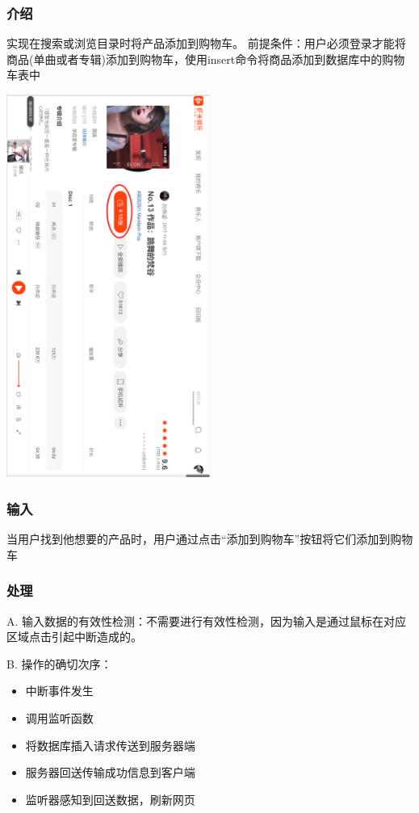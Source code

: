    \subsubsection{介绍}
   实现在搜索或浏览目录时将产品添加到购物车。
   前提条件：用户必须登录才能将商品(单曲或者专辑)添加到购物车，使用insert命令将商品添加到数据库中的购物车表中
   \begin{center}
	\begin{sideways} 
   \includegraphics[width=0.5\textwidth]{./figures/capture12.png} 
	\end{sideways}
\end{center}
   \subsubsection{输入}
   
   当用户找到他想要的产品时，用户通过点击“添加到购物车”按钮将它们添加到购物车


   \subsubsection{处理}
   

   
   A. 输入数据的有效性检测：不需要进行有效性检测，因为输入是通过鼠标在对应区域点击引起中断造成的。
   
   B. 操作的确切次序：
   \begin{adjustwidth}{2cm}{1cm}\qquad
	   \begin{itemize}
		   \item 中断事件发生
		   \item 调用监听函数
		   \item 将数据库插入请求传送到服务器端
		   \item 服务器回送传输成功信息到客户端
		   \item 监听器感知到回送数据，刷新网页
	   \end{itemize}		
   \end{adjustwidth}
	

